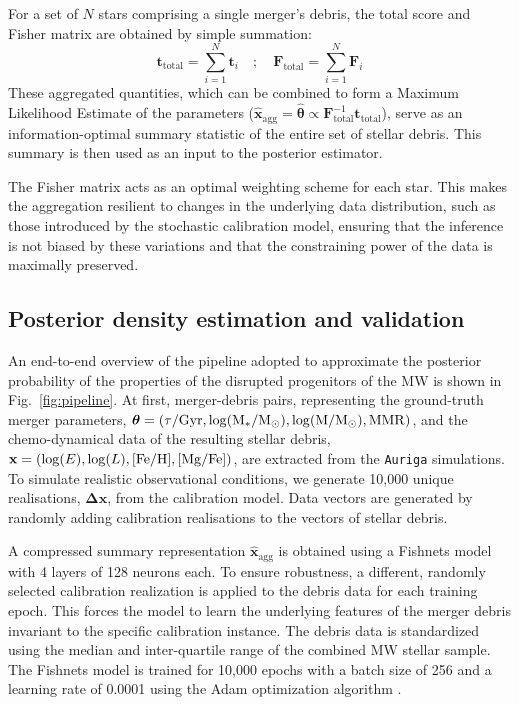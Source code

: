 For a set of $N$ stars comprising a single merger's debris, the total score and Fisher matrix are obtained by simple summation:
\begin{equation}
    \mathbf{t}_{\text{total}} = \sum_{i=1}^{N} \mathbf{t}_i \quad ; \quad \mathbf{F}_{\text{total}} = \sum_{i=1}^{N} \mathbf{F}_i
\end{equation}
These aggregated quantities, which can be combined to form a Maximum Likelihood Estimate of the parameters  ($\bm{\hat{x}}_{\mathrm{agg}} = \bm{\hat{\theta}} \propto \mathbf{F}_{\text{total}}^{-1}\mathbf{t}_{\text{total}}$), serve as an information-optimal summary statistic of the entire set of stellar debris. This summary is then used as an input to the posterior estimator.

The Fisher matrix acts as an optimal weighting scheme for each star. This makes the aggregation resilient to changes in the underlying data distribution, such as those introduced by the stochastic calibration model, ensuring that the inference is not biased by these variations and that the constraining power of the data is maximally preserved. 


\subsection{Posterior density estimation and validation}
An end-to-end overview of the pipeline adopted to approximate the posterior probability of the properties of the disrupted progenitors of the MW is shown in Fig.~\ref{fig:pipeline}. At first, merger-debris pairs, representing the ground-truth merger parameters, $\bm{\theta}=(\tau/\rm{Gyr}, \log (M_*/\mathrm{M_{\odot}}), \log (M/\mathrm{M_{\odot}}), \rm{MMR} )$, and the chemo-dynamical data of the resulting stellar debris, $\mathbf{x}=(\log(E), \log(L),\rm{[Fe/H], [Mg/Fe]})$, are extracted from the \texttt{Auriga} simulations. To simulate realistic observational conditions, we generate 10,000 unique realisations, $\mathbf{\Delta x}$, from the calibration model. Data vectors are generated by randomly adding  calibration realisations to the vectors of stellar debris.

A compressed summary representation $\bm{\hat{x}_{\mathrm{agg}}}$ is obtained using a Fishnets model with 4 layers of 128 neurons each. To ensure robustness, a different, randomly selected calibration realization is applied to the debris data for each training epoch. This forces the model to learn the underlying features of the merger debris invariant to the specific calibration instance. The debris data is standardized using the median and inter-quartile range of the combined MW stellar sample. The Fishnets model is trained for 10,000 epochs with a batch size of 256 and a learning rate of 0.0001 using the Adam optimization algorithm \citep{Kingma2014}.

